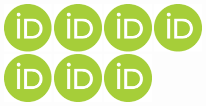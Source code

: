\documentclass{beamer}
\begin{document}

\begin{frame}
\begin{figure}[!htpb]
\label{fig:leslie}
\includegraphics[width=2.5cm]{figs/ORCIDiD_icon.png}
\includegraphics[width=2.5cm]{figs/ORCIDiD_icon.png}
\includegraphics[width=2.5cm]{figs/ORCIDiD_icon.png}
\includegraphics[width=2.5cm]{figs/ORCIDiD_icon.png}
\includegraphics[width=2.5cm]{figs/ORCIDiD_icon.png}
\includegraphics[width=2.5cm]{figs/ORCIDiD_icon.png}
\includegraphics[width=2.5cm]{figs/ORCIDiD_icon.png}

\end{figure}
\end{frame}
\end{document}
